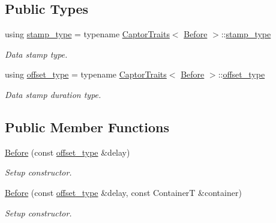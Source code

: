 \subsection*{Public Types}
\begin{DoxyCompactItemize}
\item 
\mbox{\label{classflow_1_1follower_1_1_before_a61ad031098be335251e789fddc2bf0a2}} 
using \hyperlink{classflow_1_1follower_1_1_before_a61ad031098be335251e789fddc2bf0a2}{stamp\+\_\+type} = typename \hyperlink{structflow_1_1_captor_traits}{Captor\+Traits}$<$ \hyperlink{classflow_1_1follower_1_1_before}{Before} $>$\+::\hyperlink{classflow_1_1follower_1_1_before_a61ad031098be335251e789fddc2bf0a2}{stamp\+\_\+type}
\begin{DoxyCompactList}\small\item\em Data stamp type. \end{DoxyCompactList}\item 
\mbox{\label{classflow_1_1follower_1_1_before_a5e6ae484915d746be6e4f52706fc3918}} 
using \hyperlink{classflow_1_1follower_1_1_before_a5e6ae484915d746be6e4f52706fc3918}{offset\+\_\+type} = typename \hyperlink{structflow_1_1_captor_traits}{Captor\+Traits}$<$ \hyperlink{classflow_1_1follower_1_1_before}{Before} $>$\+::\hyperlink{classflow_1_1follower_1_1_before_a5e6ae484915d746be6e4f52706fc3918}{offset\+\_\+type}
\begin{DoxyCompactList}\small\item\em Data stamp duration type. \end{DoxyCompactList}\end{DoxyCompactItemize}
\subsection*{Public Member Functions}
\begin{DoxyCompactItemize}
\item 
\hyperlink{classflow_1_1follower_1_1_before_a9c0ed69cd555e62c90f7bf70aedf0859}{Before} (const \hyperlink{classflow_1_1follower_1_1_before_a5e6ae484915d746be6e4f52706fc3918}{offset\+\_\+type} \&delay)
\begin{DoxyCompactList}\small\item\em Setup constructor. \end{DoxyCompactList}\item 
\hyperlink{classflow_1_1follower_1_1_before_a660d826032cd5bca5e33f850fd446a24}{Before} (const \hyperlink{classflow_1_1follower_1_1_before_a5e6ae484915d746be6e4f52706fc3918}{offset\+\_\+type} \&delay, const ContainerT \&container)
\begin{DoxyCompactList}\small\item\em Setup constructor. \end{DoxyCompactList}\end{DoxyCompactItemize}

